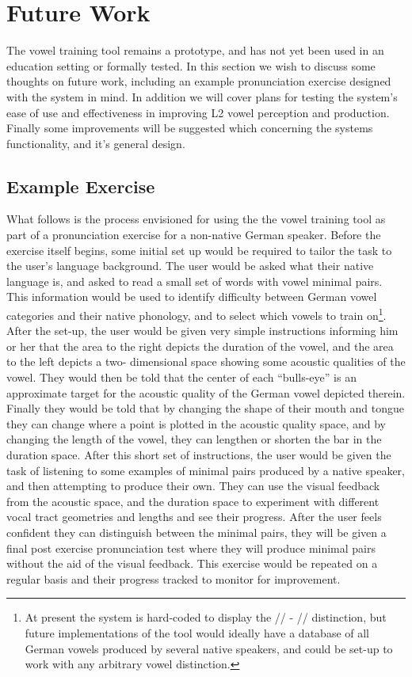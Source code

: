 
\section{Future Work}
The vowel training tool remains a prototype, and has not yet been used in an education setting or formally tested. In this section we wish to discuss some thoughts on future work, including an example pronunciation exercise designed with the system in mind. In addition we will cover plans for testing the system's ease of use and effectiveness in improving L2 vowel perception and production. Finally some improvements will be suggested which concerning the systems functionality, and it's general design. 

\subsection{Example Exercise}
What follows is the process envisioned for using the the vowel training tool as part of a pronunciation exercise for a non-native German speaker. Before the exercise itself begins, some initial set up would be required to tailor the task to the user's language background. The user would be asked what their native language is, and asked to read a small set of words with vowel minimal pairs. This information would be used to identify difficulty between German vowel categories and their native phonology, and to select which vowels to train on\footnote{At present the system is hard-coded to display the // - // distinction, but future implementations of the tool would ideally have a database of all German vowels produced by several native speakers, and could be set-up to work with any arbitrary vowel distinction.}. After the set-up, the user would be given very simple instructions informing him or her that the area to the right depicts the duration of the vowel, and the area to the left depicts a two- dimensional space showing some acoustic qualities of the vowel. They would then be told that the center of each ``bulls-eye'' is an approximate target for the acoustic quality of the German vowel depicted therein. Finally they would be told that by changing the shape of their mouth and tongue they can change where a point is plotted in the acoustic quality space, and by changing the length of the vowel, they can lengthen or shorten the bar in the duration space. After this short set of instructions, the user would be given the task of listening to some examples of minimal pairs produced by a native speaker, and then attempting to produce their own. They can use the visual feedback from the acoustic space, and the duration space to experiment with different vocal tract geometries and lengths and see their progress. After the user feels confident they can distinguish between the minimal pairs, they will be given a final post exercise pronunciation test where they will produce minimal pairs without the aid of the visual feedback. This exercise would be repeated on a regular basis and their progress tracked to monitor for improvement.

